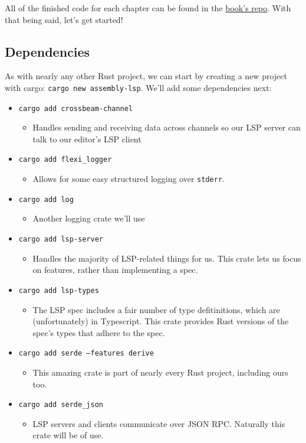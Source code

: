 All of the finished code for each chapter can be found in the \href{\URL}{book's repo}.  With that being said, let's get started!

\subsection{Dependencies}

As with nearly any other Rust project, we can start by creating a new project with cargo: \texttt{cargo new assembly-lsp}. We'll add some dependencies next:

\begin{itemize}
	\item \texttt{cargo add crossbeam-channel}
	      \begin{itemize}
		      \item Handles sending and receiving data across channels so our LSP server
		            can talk to our editor's LSP client
	      \end{itemize}
	\item \texttt{cargo add flexi\_logger}
	      \begin{itemize}
		      \item Allows for some easy structured logging over \texttt{stderr}.
	      \end{itemize}
	\item \texttt{cargo add log}
	      \begin{itemize}
		      \item Another logging crate we'll use
	      \end{itemize}
	\item \texttt{cargo add lsp-server}
	      \begin{itemize}
		      \item Handles the majority of LSP-related things for us. This crate
		            lets us focus on features, rather than implementing a spec.
	      \end{itemize}
	\item \texttt{cargo add lsp-types}
	      \begin{itemize}
		      \item The LSP spec includes a fair number of type defitinitions, which
		            are (unfortunately) in Typescript. This crate provides Rust versions
		            of the spec's types that adhere to the spec.
	      \end{itemize}
	\item \texttt{cargo add serde --features derive}
	      \begin{itemize}
		      \item This amazing crate is part of nearly every Rust project, including
		            ours too.
	      \end{itemize}
	\item \texttt{cargo add serde\_json}
	      \begin{itemize}
		      \item LSP servers and clients communicate over JSON RPC. Naturally this
		            crate will be of use.
	      \end{itemize}
\end{itemize}

